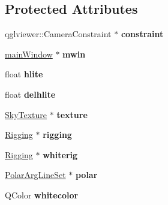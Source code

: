 \subsection*{Protected Attributes}
\begin{DoxyCompactItemize}
\item 
\hypertarget{classSkyViewer_ac34d79fe218fdd4be6e918567daed4d0}{
qglviewer::CameraConstraint $\ast$ {\bfseries constraint}}
\label{classSkyViewer_ac34d79fe218fdd4be6e918567daed4d0}

\item 
\hypertarget{classSkyViewer_a76a8b79228d7ba4e91b274e480d09e0a}{
\hyperlink{classmainWindow}{mainWindow} $\ast$ {\bfseries mwin}}
\label{classSkyViewer_a76a8b79228d7ba4e91b274e480d09e0a}

\item 
\hypertarget{classSkyViewer_ad30399dfffd037f6f0d3bbe42f36b19b}{
float {\bfseries hlite}}
\label{classSkyViewer_ad30399dfffd037f6f0d3bbe42f36b19b}

\item 
\hypertarget{classSkyViewer_a553240c67764d6cfc2db4028e05f780e}{
float {\bfseries delhlite}}
\label{classSkyViewer_a553240c67764d6cfc2db4028e05f780e}

\item 
\hypertarget{classSkyViewer_add0e4f6148e1f2929c6ac02eb93d2b0c}{
\hyperlink{classSkyTexture}{SkyTexture} $\ast$ {\bfseries texture}}
\label{classSkyViewer_add0e4f6148e1f2929c6ac02eb93d2b0c}

\item 
\hypertarget{classSkyViewer_a9b7d9c891bf943d7a3d3e24d2b6169e0}{
\hyperlink{classRigging}{Rigging} $\ast$ {\bfseries rigging}}
\label{classSkyViewer_a9b7d9c891bf943d7a3d3e24d2b6169e0}

\item 
\hypertarget{classSkyViewer_aaa8eb90b08681ea55299aa59cd4e6ba0}{
\hyperlink{classRigging}{Rigging} $\ast$ {\bfseries whiterig}}
\label{classSkyViewer_aaa8eb90b08681ea55299aa59cd4e6ba0}

\item 
\hypertarget{classSkyViewer_ac8860569b6ec402919703873f9b5b082}{
\hyperlink{classPolarArgLineSet}{PolarArgLineSet} $\ast$ {\bfseries polar}}
\label{classSkyViewer_ac8860569b6ec402919703873f9b5b082}

\item 
\hypertarget{classSkyViewer_a785da7257ffbe4fd82ed70aa77b77f88}{
QColor {\bfseries whitecolor}}
\label{classSkyViewer_a785da7257ffbe4fd82ed70aa77b77f88}


\end{DoxyCompactItemize}
